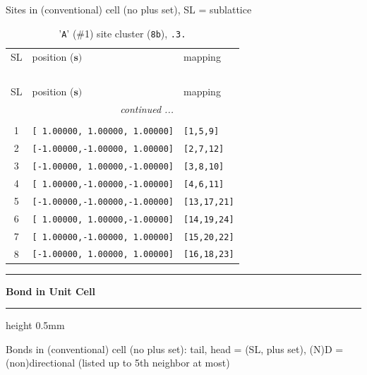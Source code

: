 \documentclass[fleqn,10pt,landscape]{jsarticle}
\begin{document}
\noindent Sites in (conventional) cell (no plus set), SL = sublattice

\renewcommand{\arraystretch}{1.6}
\begin{longtable}[l]{cll}
\captionsetup{justification=raggedright, singlelinecheck=off}
\caption{'\texttt{A}' (\#1) site cluster (\texttt{8b}), \texttt{.3.}}
 \\
 \hline \hline
SL & position ($\bm{s})$ & mapping \\ \hline \endfirsthead

\multicolumn{2}{l}{\tablename\ \thetable{}} \\
 \hline \hline
SL & position ($\bm{s})$ & mapping \\ \hline \endhead

 \hline \hline
\multicolumn{2}{r}{\footnotesize\it continued ...} \\ \endfoot

 \hline \hline
\multicolumn{2}{r}{} \\ \endlastfoot

1 & \texttt{[ 1.00000, 1.00000, 1.00000]} & \texttt{[1,5,9]} \\ \hline
2 & \texttt{[-1.00000,-1.00000, 1.00000]} & \texttt{[2,7,12]} \\ \hline
3 & \texttt{[-1.00000, 1.00000,-1.00000]} & \texttt{[3,8,10]} \\ \hline
4 & \texttt{[ 1.00000,-1.00000,-1.00000]} & \texttt{[4,6,11]} \\ \hline
5 & \texttt{[-1.00000,-1.00000,-1.00000]} & \texttt{[13,17,21]} \\ \hline
6 & \texttt{[ 1.00000, 1.00000,-1.00000]} & \texttt{[14,19,24]} \\ \hline
7 & \texttt{[ 1.00000,-1.00000, 1.00000]} & \texttt{[15,20,22]} \\ \hline
8 & \texttt{[-1.00000, 1.00000, 1.00000]} & \texttt{[16,18,23]} \\
\end{longtable}
\vspace{5mm}
\noindent \rule[0.5mm]{5mm}{0.5mm}\hspace{3mm}\textbf{Bond in Unit Cell}\hspace{3mm}\leaders\hrule height 0.5mm\hfill\kern0pt
\vspace{3mm}

\noindent Bonds in (conventional) cell (no plus set): tail, head = (SL, plus set), (N)D = (non)directional (listed up to 5th neighbor at most)
\end{document}
